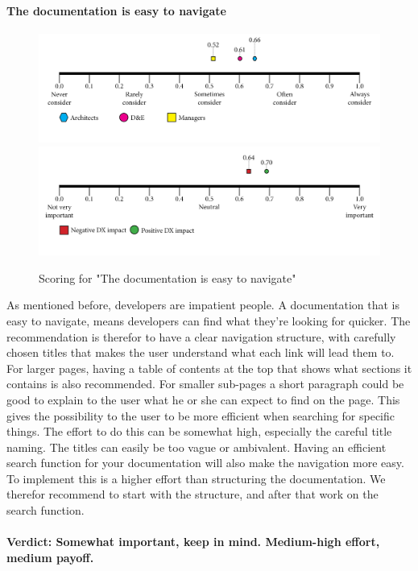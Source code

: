    \paragraph{The documentation is easy to navigate}
    \begin{figure}[H]
        \centering
        \includegraphics[width=\linewidth]{scorelines/aspect7.png}
        \includegraphics[width=\linewidth]{dxscorelines/dxaspect7.png}
        \caption{Scoring for "The documentation is easy to navigate"}
        \label{fig:aspect7}
    \end{figure}
    As mentioned before, developers are impatient people. A documentation that is easy to navigate, means developers can find what they're looking for quicker. The recommendation is therefor to have a clear navigation structure, with carefully chosen titles that makes the user understand what each link will lead them to. For larger pages, having a table of contents at the top that shows what sections it contains is also recommended. For smaller sub-pages a short paragraph could be good to explain to the user what he or she can expect to find on the page. This gives the possibility to the user to be more efficient when searching for specific things. The effort to do this can be somewhat high, especially the careful title naming. The titles can easily be too vague or ambivalent. Having an efficient search function for your documentation will also make the navigation more easy. To implement this is a higher effort than structuring the documentation. We therefor recommend to start with the structure, and after that work on the search function. \\ \\
    \textbf{Verdict: Somewhat important, keep in mind. Medium-high effort, medium payoff.}
    
